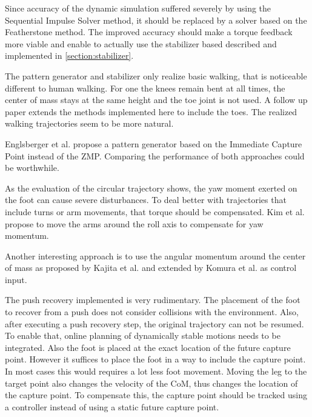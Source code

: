 \documentclass[english,ngerman]{KITreprt}
\begin{document}
Since accuracy of the dynamic simulation suffered severely by using the
Sequential Impulse Solver method, it should be replaced by a solver
based on the Featherstone method. The improved accuracy should make a
torque feedback more viable and enable to actually use the stabilizer
based described and implemented in \ref{section:stabilizer}.

The pattern generator and stabilizer only realize basic walking, that is
noticeable different to human walking. For one the knees remain bent at
all times, the center of mass stays at the same height and the toe joint
is not used. A follow up paper \cite{kajita2012evaluation} extends the
methods implemented here to include the toes. The realized walking
trajectories seem to be more natural.

Englsberger et al. \cite{englsberger2011bipedal} propose a pattern
generator based on the Immediate Capture Point instead of the ZMP.
Comparing the performance of both approaches could be worthwhile.

As the evaluation of the circular trajectory shows, the yaw moment
exerted on the foot can cause severe disturbances. To deal better with
trajectories that include turns or arm movements, that torque should be
compensated. Kim et al.\cite{kim2005humanoid} propose to move the arms
around the roll axis to compensate for yaw momentum.

Another interesting approach is to use the angular momentum around the
center of mass as proposed by Kajita et al. \cite{kajita2001balancing}
and extended by Komura et al. \cite{komura2005feedback} as control
input.

The push recovery implemented is very rudimentary. The placement of the
foot to recover from a push does not consider collisions with the
environment. Also, after executing a push recovery step, the original
trajectory can not be resumed. To enable that, online planning of
dynamically stable motions needs to be integrated. Also the foot is
placed at the exact location of the future capture point. However it
suffices to place the foot in a way to include the capture point. In
most cases this would requires a lot less foot movement. Moving the leg
to the target point also changes the velocity of the CoM, thus changes
the location of the capture point. To compensate this, the capture point
should be tracked using a controller instead of using a static future
capture point.




\end{document}
